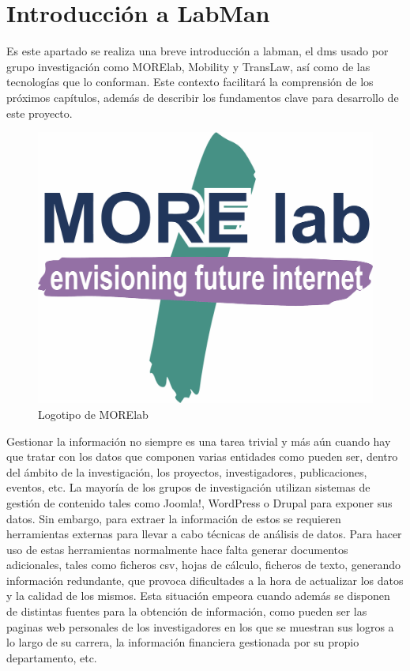 \section{Introducción a LabMan}

Es este apartado se realiza una breve introducción a \acrfull{labman}, el \acrshort{dms} usado por grupo investigación como MORElab, Mobility y TransLaw, así como de las tecnologías que lo conforman. Este contexto facilitará la comprensión de los próximos capítulos, además de describir los fundamentos clave para desarrollo de este proyecto.

\begin{figure}[!htp]
	\centering
	\includegraphics[scale=0.15]{fig/MORElab-logo}
	\caption{Logotipo de MORElab}
\end{figure}

Gestionar la información no siempre es una tarea trivial y más aún cuando hay que tratar con los datos que componen varias entidades como pueden ser, dentro del ámbito de la investigación, los proyectos, investigadores, publicaciones, eventos, etc. La mayoría de los grupos de investigación utilizan sistemas de gestión de contenido tales como Joomla!\cite{joomla}, WordPress\cite{wordpress} o Drupal\cite{drupal} para exponer sus datos. Sin embargo, para extraer la información de estos  se requieren herramientas externas para llevar a cabo técnicas de análisis de datos. 
Para hacer uso de estas herramientas normalmente hace falta generar documentos adicionales, tales como ficheros \acrfull{csv}, hojas de cálculo, ficheros de texto, generando información redundante, que provoca dificultades a la hora de actualizar los datos y la calidad de los mismos. Esta situación empeora cuando además se disponen de distintas fuentes para la obtención de información, como pueden ser las paginas web personales de los investigadores en los que se muestran sus logros a lo largo de su carrera, la información financiera gestionada por su propio departamento, etc.

